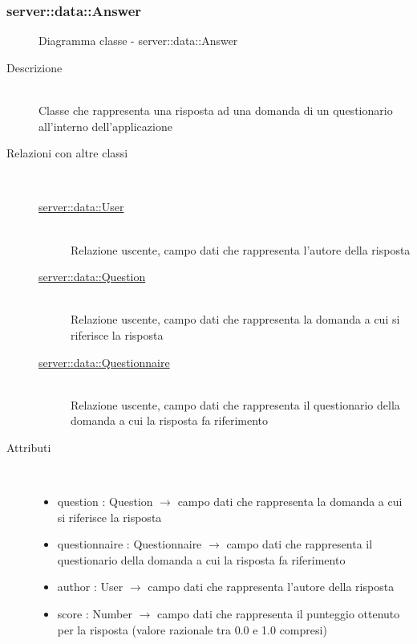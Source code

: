 \subsubsection[Answer]{server::data::Answer}
\begin{figure}[H]
	\centering
	\caption{Diagramma classe - server::data::Answer}
\end{figure}\begin{description}
\item[Descrizione] \hfill \\
Classe che rappresenta una risposta ad una domanda di un questionario all'interno dell'applicazione
\item[Relazioni con altre classi] \hfill \\
\vspace{-7mm}
\begin{description}
	\item[\hyperlink{server::data::User}{server::data::User}] \hfill \\
	Relazione uscente, campo dati che rappresenta l'autore della risposta
	\item[\hyperlink{server::data::Question}{server::data::Question}] \hfill \\
	Relazione uscente, campo dati che rappresenta la domanda a cui si riferisce la risposta
	\item[\hyperlink{server::data::Questionnaire}{server::data::Questionnaire}] \hfill \\
	Relazione uscente, campo dati che rappresenta il questionario della domanda a cui la risposta fa riferimento
\end{description}

\item[Attributi] \hfill \\
\vspace{-7mm}
\begin{itemize}
	\item question : Question $\rightarrow$ campo dati che rappresenta la domanda a cui si riferisce la risposta
	\item questionnaire : Questionnaire $\rightarrow$ campo dati che rappresenta il questionario della domanda a cui la risposta fa riferimento
	\item author : User $\rightarrow$ campo dati che rappresenta l'autore della risposta
	\item score : Number $\rightarrow$ campo dati che rappresenta il punteggio ottenuto per la risposta (valore razionale tra 0.0 e 1.0 compresi)
\end{itemize}


\end{description}
